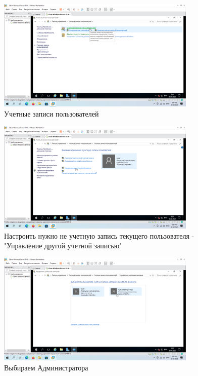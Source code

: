 \documentclass[a4paper]{article}
\begin{document}
  \begin{figure}[H]
    \centering
    \includegraphics[width=0.85\textwidth]{Screenshot_33}
    \caption{Учетные записи пользователей}
    \label{img:33}
  \end{figure}

  \begin{figure}[H]
    \centering
    \includegraphics[width=0.85\textwidth]{Screenshot_34}
    \caption{Настроить нужно не учетную запись текущего пользователя - "Управление другой учетной записью"}
    \label{img:34}
  \end{figure}

  \begin{figure}[H]
    \centering
    \includegraphics[width=0.85\textwidth]{Screenshot_35}
    \caption{Выбираем Администратора}
    \label{img:35}
  \end{figure}
\end{document}
